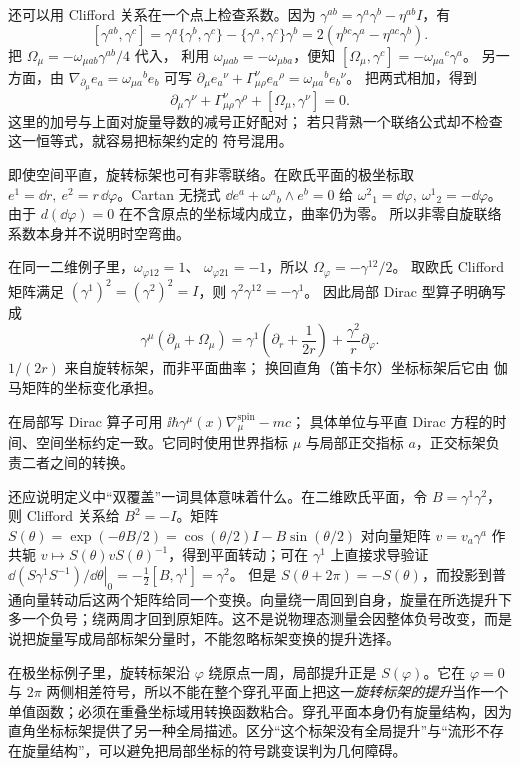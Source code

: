 还可以用 Clifford 关系在一个点上检查系数。因为
\(\gamma^{ab}=\gamma^a\gamma^b-\eta^{ab}I\)，有
\[
[\gamma^{ab},\gamma^c]
=\gamma^a\{\gamma^b,\gamma^c\}
 -\{\gamma^a,\gamma^c\}\gamma^b
=2(\eta^{bc}\gamma^a-\eta^{ac}\gamma^b).
\]
把 \(\Omega_\mu=-\omega_{\mu ab}\gamma^{ab}/4\) 代入，
利用 \(\omega_{\mu ab}=-\omega_{\mu ba}\)，便知
\([\Omega_\mu,\gamma^c]=-\omega_{\mu a}{}^c\gamma^a\)。
另一方面，由
\(\nabla_{\partial_\mu}e_a=\omega_{\mu a}{}^b e_b\)
可写
\(\partial_\mu e_a{}^\nu+\Gamma^\nu_{\mu\rho}e_a{}^\rho
=\omega_{\mu a}{}^b e_b{}^\nu\)。
把两式相加，得到
\[
\partial_\mu\gamma^\nu+\Gamma^\nu_{\mu\rho}\gamma^\rho
+[\Omega_\mu,\gamma^\nu]=0.
\]
这里的加号与上面对旋量导数的减号正好配对；
若只背熟一个联络公式却不检查这一恒等式，就容易把标架约定的
符号混用。

即使空间平直，旋转标架也可有非零联络。在欧氏平面的极坐标取
\(e^1=\dd r,\ e^2=r\,\dd \varphi\)。Cartan 无挠式
\(\dd e^a+\omega^a{}_b\wedge e^b=0\) 给
\(\omega^2{}_1=\dd \varphi,\ \omega^1{}_2=-\dd \varphi\)。
由于 \(d(\dd \varphi)=0\) 在不含原点的坐标域内成立，曲率仍为零。
所以非零自旋联络系数本身并不说明时空弯曲。

在同一二维例子里，\(\omega_{\varphi12}=1\)、
\(\omega_{\varphi21}=-1\)，所以
\(\Omega_\varphi=-\gamma^{12}/2\)。
取欧氏 Clifford 矩阵满足
\((\gamma^1)^2=(\gamma^2)^2=I\)，则
\(\gamma^2\gamma^{12}=-\gamma^1\)。
因此局部 Dirac 型算子明确写成
\[
\gamma^\mu(\partial_\mu+\Omega_\mu)
=\gamma^1\left(\partial_r+\frac1{2r}\right)
 +\frac{\gamma^2}{r}\partial_\varphi .
\]
\(1/(2r)\) 来自旋转标架，而非平面曲率；
换回直角（笛卡尔）坐标标架后它由 伽马矩阵的坐标变化承担。

在局部写 Dirac 算子可用
\(\ii\hbar\gamma^\mu(x)\nabla_\mu^{\mathrm{spin}}-mc\)；
具体单位与平直 Dirac 方程的时间、空间坐标约定一致。它同时使用世界指标 \(\mu\) 与局部正交指标 \(a\)，正交标架负责二者之间的转换。

还应说明定义中“双覆盖”一词具体意味着什么。在二维欧氏平面，令
\(B=\gamma^1\gamma^2\)，则 Clifford 关系给 \(B^2=-I\)。矩阵
\(S(\theta)=\exp(-\theta B/2)
=\cos(\theta/2)I-B\sin(\theta/2)\)
对向量矩阵 \(v=v_a\gamma^a\) 作共轭
\(v\mapsto S(\theta)vS(\theta)^{-1}\)，得到平面转动；可在
\(\gamma^1\) 上直接求导验证
\(\left.\dd(S\gamma^1S^{-1})/\dd\theta\right|_0
=-\tfrac12[B,\gamma^1]=\gamma^2\)。
但是 \(S(\theta+2\pi)=-S(\theta)\)，而投影到普通向量转动后这两个矩阵给同一个变换。向量绕一周回到自身，旋量在所选提升下多一个负号；绕两周才回到原矩阵。这不是说物理态测量会因整体负号改变，而是说把旋量写成局部标架分量时，不能忽略标架变换的提升选择。

在极坐标例子里，旋转标架沿 \(\varphi\) 绕原点一周，局部提升正是 \(S(\varphi)\)。它在 \(\varphi=0\) 与 \(2\pi\) 两侧相差符号，所以不能在整个穿孔平面上把这一\emph{旋转标架的提升}当作一个单值函数；必须在重叠坐标域用转换函数粘合。穿孔平面本身仍有旋量结构，因为直角坐标标架提供了另一种全局描述。区分“这个标架没有全局提升”与“流形不存在旋量结构”，可以避免把局部坐标的符号跳变误判为几何障碍。



